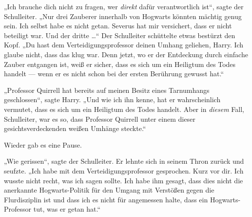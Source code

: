 „Ich brauche dich nicht zu fragen, wer \emph{direkt} dafür verantwortlich ist“, sagte der Schulleiter.
„Nur drei Zauberer innerhalb von Hogwarts könnten mächtig genug sein. Ich selbst habe es nicht getan. Severus hat mir versichert, dass er nicht beteiligt war. Und der dritte …“ Der Schulleiter schüttelte etwas bestürzt den Kopf.
„Du hast dem Verteidigungsprofessor deinen Umhang geliehen, Harry. Ich glaube nicht, dass das klug war. Denn jetzt, wo er der Entdeckung durch einfache Zauber entgangen ist, weiß er sicher, dass es sich um ein Heiligtum des Todes handelt — wenn er es nicht schon bei der ersten Berührung gewusst hat.“

„Professor Quirrell hat bereits auf meinen Besitz eines Tarnumhangs geschlossen“, sagte Harry.
„Und wie ich ihn kenne, hat er wahrscheinlich vermutet, dass es sich um ein Heiligtum des Todes handelt. Aber in \emph{diesem} Fall, Schulleiter, war es so, dass Professor Quirrell unter einem dieser gesichtsverdeckenden weißen Umhänge steckte.“

Wieder gab es eine Pause.

„Wie gerissen“, sagte der Schulleiter. Er lehnte sich in seinem Thron zurück und seufzte.
„Ich habe mit dem Verteidigungsprofessor gesprochen. Kurz vor dir. Ich wusste nicht recht, was ich sagen sollte. Ich habe ihm gesagt, dass dies nicht die anerkannte Hogwarts-Politik für den Umgang mit Verstößen gegen die Flurdisziplin ist und dass ich es nicht für angemessen halte, dass ein Hogwarts-Professor tut, was er getan hat.“

